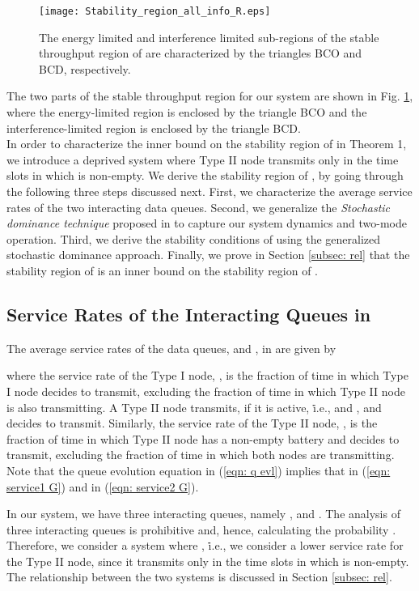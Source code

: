 \documentclass[draftcls,12pt,onecolumn]{IEEEtran}
\begin{document}
\begin{figure}
\texttt{[image: Stability\_region\_all\_info\_R.eps]}
\centering
\caption{The energy limited and interference limited sub-regions of the stable throughput region of  are characterized by the triangles BCO and BCD, respectively.}\label{fig:region}
\end{figure}
\indent The two parts of the stable throughput region for our system are shown in Fig. \ref{fig:region}, where the energy-limited region is enclosed by the triangle BCO and the interference-limited region is enclosed by the triangle BCD.\\
\indent In order to characterize the inner bound on the stability region of  in Theorem 1, we introduce a deprived system  where Type II node transmits only in the time slots in which  is non-empty. We derive the stability region of , by going through the following three steps discussed next. First, we characterize the average service rates of the two interacting data queues. Second, we generalize the \emph{Stochastic dominance technique} proposed in \cite{rao1988stability} to capture our system dynamics and two-mode operation. Third, we derive the stability conditions of  using the generalized stochastic dominance approach. Finally, we prove in Section \ref{subsec: rel} that the stability region of  is an inner bound on the stability region of .
\vspace{-0.15in}
\subsection{Service Rates of the Interacting Queues in }\label{subsec: Ser G}
The average service rates of the data queues,  and , in  are given by 

where the service rate of the Type I node, , is the fraction of time in which Type I node decides to transmit, excluding the fraction of time in which Type II node is also transmitting. A Type II node transmits, if it is active, \.i.e.,  and , and decides to transmit. Similarly, the service rate of the Type II node, , is the fraction of time in which Type II node has a non-empty battery and decides to transmit, excluding the fraction of time in which both nodes are transmitting. Note that the queue evolution equation in (\ref{eqn: q evl}) implies that  in (\ref{eqn: service1 G}) and  in (\ref{eqn: service2 G}). 

In our system, we have three interacting queues, namely ,  and . The analysis of three interacting queues is prohibitive and, hence, calculating the probability . Therefore, we consider a system  where , \.i.e., we consider a lower service rate for the Type II node, since it transmits only in the time slots in which  is non-empty. The relationship between the two systems is discussed in Section \ref{subsec: rel}.
\vspace{-0.15in}
\end{document}
